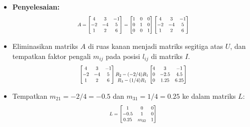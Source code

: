 \documentclass[pdflatex,compress,mathserif]{beamer}
\newcommand*{\Scale}[2][4]{\scalebox{#1}{$#2$}}%
\begin{document}
\begin{frame}
	\begin{itemize}
		\item \textbf{Penyelesaian:}
		\[\Scale[0.7]{ A = 
		\begin{bmatrix}
			4 & 3 & -1\\
			-2 & -4 & 5\\
			1 & 2 & 6\\
		\end{bmatrix}
		=
		\begin{bmatrix}
			1 & 0 & 0\\
			0 & 1 & 0\\
			0 & 0 & 1\\
		\end{bmatrix}
		\begin{bmatrix}
			4 & 3 & -1\\
			-2 & -4 & 5\\
			1 & 2 & 6\\
		\end{bmatrix}
		}\]
		\item Eliminasikan matriks $ A $ di ruas kanan menjadi matriks segitiga atas $ U $, dan tempatkan faktor pengali $ m_{ij} $ pada posisi $ l_{ij} $ di matriks $ I $.
		\[\Scale[0.7]{
		\begin{bmatrix}
			4 & 3 & -1\\
			-2 & -4 & 5\\
			1 & 2 & 6\\
		\end{bmatrix}
		\begin{matrix}
			\\
			R_2 - (-2/4)R_1\\
			R_3 - (1/4)R_1
		\end{matrix}
		\begin{bmatrix}
			4 & 3 & -1\\
			0 & -2.5 & 4.5\\
			0 & 1.25 & 6.25\\
		\end{bmatrix}
		}\]
		\item Tempatkan $ m_{21} = -2/4 = -0.5 $ dan $ m_{31} = 1/4 = 0.25 $ ke dalam matriks $ L $:
		\[\Scale[0.7]{ L = 
		\begin{bmatrix}
			1 & 0 & 0\\
			-0.5 & 1 & 0\\
			0.25 & m_{32} & 1\\
		\end{bmatrix}
		}\]
	\end{itemize}
\end{frame}
\end{document}
